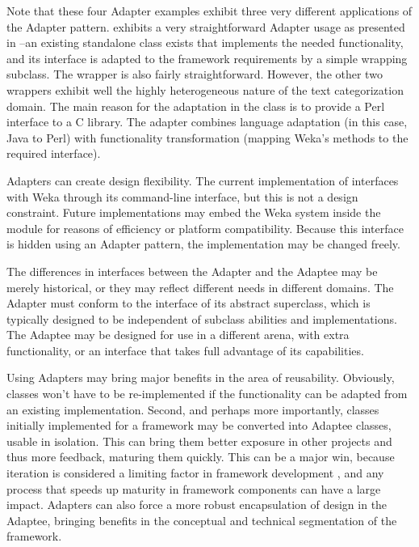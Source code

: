 Note that these four Adapter examples exhibit three very different
applications of the Adapter pattern.  
exhibits a very straightforward Adapter usage as presented in
\cite{gamma:95}--an existing standalone class exists that implements the
needed functionality, and its interface is adapted to the framework
requirements by a simple wrapping subclass.  The 
wrapper is also fairly straightforward.  However, the other two
wrappers exhibit well the highly heterogeneous nature of the text
categorization domain.  The main reason for the adaptation in the
 class is to provide a Perl interface to a C
library.  The  adapter combines language
adaptation (in this case, Java to Perl) with functionality
transformation (mapping Weka's methods to the required 
interface).

Adapters can create design flexibility.
The current implementation of  interfaces with
Weka through its command-line interface, but this is not a design
constraint.  Future implementations may embed the Weka system inside
the  module for reasons of efficiency or platform
compatibility.  Because this interface is hidden using an Adapter
pattern, the implementation may be changed freely.

The differences in interfaces between the Adapter and the Adaptee may
be merely historical, or they may reflect different needs in different
domains.  The Adapter must conform to the interface of its abstract
superclass, which is typically designed to be independent of subclass
abilities and implementations.  The Adaptee may be designed for use in
a different arena, with extra functionality, or an interface that
takes full advantage of its capabilities.

Using Adapters may bring major benefits in the area of reusability.
Obviously, classes won't have to be re-implemented if the
functionality can be adapted from an existing implementation.  Second,
and perhaps more importantly, classes initially implemented for a
framework may be converted into Adaptee classes, usable in isolation.
This can bring them better exposure in other projects and thus more
feedback, maturing them quickly.  This can be a major win, because
iteration is considered a limiting factor in framework development
\cite[p. 75]{fayad:99}, and any process that speeds up maturity in
framework components can have a large impact.  Adapters can also force
a more robust encapsulation of design in the Adaptee, bringing
benefits in the conceptual and technical segmentation of the
framework.

